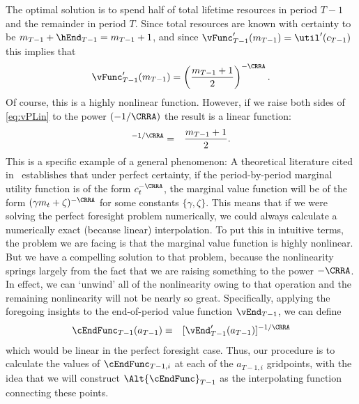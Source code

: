 \documentclass[titlepage]{\econtex}
\begin{document}
The optimal solution is to spend half of total lifetime resources in
period $T-1$ and the remainder in period $T$.  Since total resources
are known with certainty to be
${m}_{T-1}+\hEnd_{T-1}= {m}_{T-1}+1$, and since
${\vFunc}_{T-1}^{\prime}({m}_{T-1}) = \util^{\prime}({c}_{T-1})$ this
implies that 
\begin{equation}
        \vFunc^{\prime}_{T-1}({m}_{T-1})  = \left(\frac{{m}_{T-1}+1}{2}\right)^{-\CRRA} \label{eq:vPLin}.
\end{equation}
Of course, this is a highly nonlinear
function.  However, if we raise both sides of \eqref{eq:vPLin} to the
power $(-1/\CRRA)$ the result is a linear function:
\begin{eqnarray}
        [\vFunc^{\prime}_{T-1}({m}_{T-1})]^{-1/\CRRA} & = & \frac{{m}_{T-1}+1}{2}  .
\end{eqnarray}
This is a specific example of a general phenomenon: A theoretical
literature cited in~\cite{carroll&kimball:concavity} establishes that under
perfect certainty, if the period-by-period marginal utility function
is of the form ${c}_{t}^{-\CRRA}$, the marginal value function will be
of the form $(\gamma {m}_{t}+\zeta)^{-\CRRA}$ for some constants
$\{\gamma,\zeta\}$.  This means that if we were solving the perfect
foresight problem numerically, we could always calculate a numerically
exact (because linear) interpolation.  To put this in intuitive terms,
the problem we are facing is that the marginal value function is
highly nonlinear.  But we have a compelling solution to that problem,
because the nonlinearity springs largely from the fact that we are raising
something to the power $-\CRRA$.  In effect, we can `unwind' all of
the nonlinearity owing to that operation and the remaining
nonlinearity will not be nearly so great.  Specifically, applying the foregoing insights
to the end-of-period value function $\vEnd_{T-1}$, we can define
\begin{eqnarray}
        \cEndFunc_{T-1}({a}_{T-1}) & \equiv & [\vEnd_{T-1}^{\prime}({a}_{T-1})]^{-1/\CRRA} \label{eq:cGoth}
\end{eqnarray}
which would be linear in the perfect foresight case.  Thus, our
procedure is to calculate the values of $\cEndFunc_{T-1,i}$ at each
of the ${a}_{T-1,i}$ gridpoints, with the idea that we will construct
$\Alt{\cEndFunc}_{T-1}$ as the interpolating function connecting
these
points.  %
\end{document}

